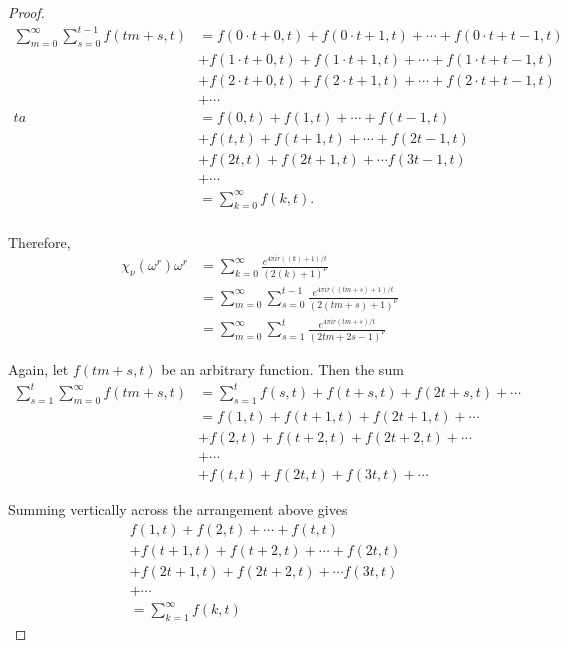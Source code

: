 \documentclass[../article.tex]{subfiles}
\begin{document}
\begin{proof}
\begin{equation}
\begin{split}
\sum_{m=0}^{\infty} \sum_{s=0}^{t-1} f(tm+s,t) &= f(0 \cdot t + 0, t) + f(0 \cdot t +1, t) + \cdots + f(0 \cdot t + t-1, t) \\
&+ f(1 \cdot t + 0, t) + f(1 \cdot t + 1,t ) + \cdots + f(1 \cdot t + t-1, t) \\
&+ f(2 \cdot t + 0, t) + f(2 \cdot t +1, t) + \cdots + f(2 \cdot t + t-1, t) \\
&+ \cdots \\ta
&= f(0, t) + f(1, t) + \cdots + f(t-1, t) \\
&+ f(t, t) + f(t+1, t) + \cdots + f(2t-1, t) \\
&+f(2t, t) + f(2t +1, t) + \cdots f(3t-1, t) \\
&+\cdots \\
&= \sum_{k=0}^{\infty} f(k,t). \\
\end{split}
\end{equation}

Therefore,
\begin{equation}
\begin{split}
\chi_{\nu}(\omega^r)\omega^r &= \sum_{k=0}^{\infty} \frac{e^{4 \pi ir((k)+1)/t}}{(2(k)+1)^{\nu}} \\
&= \sum_{m=0}^{\infty} \sum_{s=0}^{t-1}  \frac{e^{4 \pi ir((tm+s) +1)/t}}{(2(tm+s)+1)^{\nu}} \\
&= \sum_{m=0}^{\infty} \sum_{s=1}^{t}  \frac{e^{4 \pi ir(tm+s)/t}}{(2tm+2s-1)^{\nu}} \
\end{split}
\end{equation}

Again, let $f(tm + s, t)$ be an arbitrary function. Then the sum
\begin{equation}
\begin{split}
\sum_{s=1}^{t} \sum_{m=0}^{\infty} f(tm+s, t) &= \sum_{s=1}^{t} f(s,t) + f(t+s,t) + f(2t +s, t) + \cdots \\
&= f(1,t) + f(t+1,t) + f(2t+1,t) + \cdots \\
&+ f(2,t) + f(t+2,t) + f(2t+2,t) + \cdots \\
&+ \cdots \\
&+ f(t,t) + f(2t,t) +f(3t, t) + \cdots
\end{split}
\end{equation}

Summing vertically across the arrangement above gives
\begin{equation}
\begin{split}
&f(1, t) + f(2, t) + \cdots + f(t, t) \\
&+ f(t+1, t) + f(t+2, t) + \cdots + f(2t, t) \\
&+f(2t+1, t) + f(2t +2, t) + \cdots f(3t, t) \\
&+\cdots \\
&= \sum_{k=1}^{\infty} f(k,t)
\end{split}
\end{equation}


\end{proof}
\end{document}
